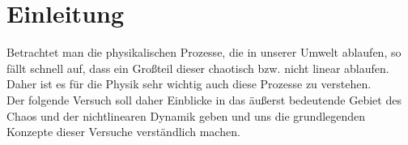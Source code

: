 

\chapter{Einleitung}
\label{chap:einleitung}

Betrachtet man die physikalischen Prozesse, die in unserer Umwelt ablaufen, so fällt schnell auf, dass ein Großteil dieser chaotisch bzw. nicht linear ablaufen. Daher ist es für die Physik sehr wichtig auch diese Prozesse zu verstehen.\\
Der folgende Versuch soll daher Einblicke in das äußerst bedeutende Gebiet des Chaos und der nichtlinearen Dynamik geben und uns die grundlegenden Konzepte dieser Versuche verständlich machen.